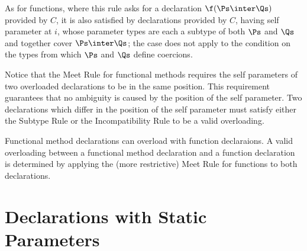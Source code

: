 As for functions, where this rule asks for a declaration
$\f(\Ps \inter \Qs)$ provided by $C$, it is also satisfied by declarations
provided by $C$, having self parameter at $i$, whose parameter types are each a
subtype of both $\Ps$ and $\Qs$ and together cover $\Ps \inter \Qs$; the case
does not apply to the condition on the types from which $\Ps$ and $\Qs$ define
coercions.

Notice that the Meet Rule for functional methods requires the self
parameters of two overloaded declarations to be in the same position.
This requirement guarantees that no ambiguity is caused by the
position of the self parameter.  Two declarations which differ in the
position of the self parameter must satisfy either the Subtype Rule or
the Incompatibility Rule to be a valid overloading.

Functional method declarations can overload with function declaraions.
A valid overloading between a functional method declaration and
a function declaration is
determined by applying the (more restrictive) Meet Rule for functions
to both declarations.

\section{Declarations with Static Parameters}

